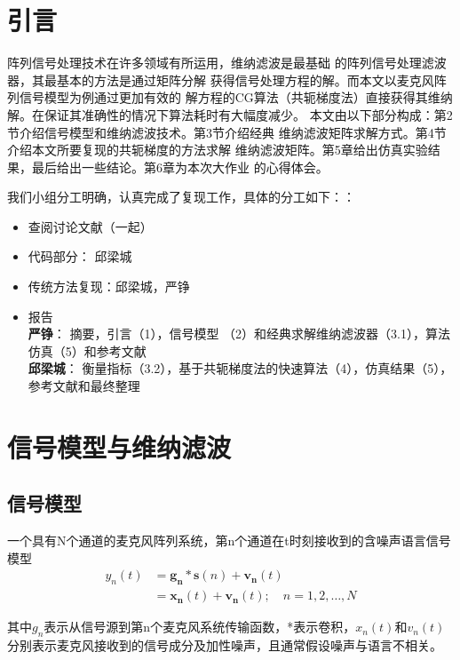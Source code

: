 
\section{引言}
阵列信号处理技术在许多领域有所运用，维纳滤波是最基础
的阵列信号处理滤波器，其最基本的方法是通过矩阵分解
获得信号处理方程的解。而本文以麦克风阵列信号模型为例通过更加有效的
解方程的CG算法（共轭梯度法）直接获得其维纳解。在保证其准确性的情况下算法耗时有大幅度减少。
本文由以下部分构成：第2节介绍信号模型和维纳滤波技术。第3节介绍经典
维纳滤波矩阵求解方式。第4节介绍本文所要复现的共轭梯度的方法求解
维纳滤波矩阵。第5章给出仿真实验结果，最后给出一些结论。第6章为本次大作业
的心得体会。

我们小组分工明确，认真完成了复现工作，具体的分工如下：：
\begin{itemize}
\item
查阅讨论文献（一起）
\item{代码部分}：
 邱梁城
\item{传统方法复现}：邱梁城，严铮
\item{报告} \\
\textbf{严铮}：
摘要，引言（1），信号模型 （2）和经典求解维纳滤波器（3.1），算法仿真（5）和参考文献\\
\textbf{邱梁城}：
衡量指标（3.2），基于共轭梯度法的快速算法（4），仿真结果（5），参考文献和最终整理\\ 
\end{itemize}

\section{信号模型与维纳滤波}
\subsection{信号模型}
一个具有N个通道的麦克风阵列系统，第n个通道在t时刻接收到的含噪声语言信号模型
\begin{align}
	y_n(t) &= \mathbf{g_n} \ast \mathbf{s}(n) + \mathbf{v_n}(t) \\
	&= \mathbf{x_n}(t) + \mathbf{v_n}(t); \quad n=1,2,\ldots,N
\end{align}

其中$g_n$表示从信号源到第n个麦克风系统传输函数，*表示卷积，$x_n(t)$和$v_n(t)$分别表示麦克风接收到的信号成分及加性噪声，且通常假设噪声与语言不相关。

